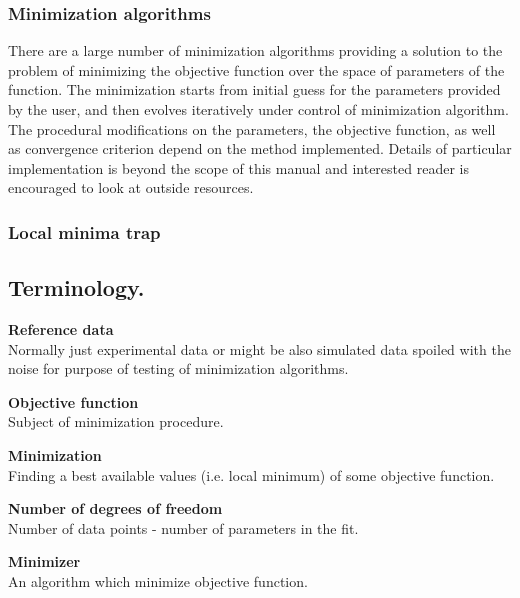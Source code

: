 \subsubsection*{Minimization algorithms}
There are a large number of minimization algorithms providing a solution to the problem
of minimizing the objective function over the space of parameters of the function.
The minimization starts from initial guess for the parameters provided by the user,
and then evolves iteratively under control of minimization algorithm. The procedural
modifications on the parameters, the objective function, as well as convergence
criterion depend on the method implemented.
Details of particular implementation is beyond the scope of this manual and
 interested reader is encouraged to look at outside resources.



\subsubsection*{Local minima trap}




\subsection{Terminology.}

\noindent
{\bf Reference data} \\
Normally just experimental data or might be also simulated data
spoiled with the noise for purpose of testing of minimization algorithms.
\vspace*{1mm}

\noindent
{\bf Objective function} \\
Subject of minimization procedure.
\vspace*{1mm}

\noindent
{\bf Minimization} \\
Finding a best available values (i.e. local minimum) of some objective function. 
\vspace*{1mm}

\noindent
{\bf Number of degrees of freedom} \\
Number of data points - number of parameters in the fit.
\vspace*{1mm}

\noindent
{\bf Minimizer} \\
An algorithm which minimize objective function. 

